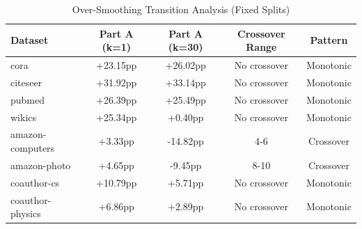 \begin{table}[t]
\centering
\caption{Over-Smoothing Transition Analysis (Fixed Splits)}
\label{tab:crossover_analysis_fixed}
\begin{tabular}{lcccc}
\toprule
\textbf{Dataset} & \textbf{Part A (k=1)} & \textbf{Part A (k=30)} & \textbf{Crossover Range} & \textbf{Pattern} \\
\midrule
cora                 &  +23.15pp &  +26.02pp & No crossover    & Monotonic \\
citeseer             &  +31.92pp &  +33.14pp & No crossover    & Monotonic \\
pubmed               &  +26.39pp &  +25.49pp & No crossover    & Monotonic \\
wikics               &  +25.34pp &   +0.40pp & No crossover    & Monotonic \\
amazon-computers     &   +3.33pp &  -14.82pp & 4-6             & Crossover \\
amazon-photo         &   +4.65pp &   -9.45pp & 8-10            & Crossover \\
coauthor-cs          &  +10.79pp &   +5.71pp & No crossover    & Monotonic \\
coauthor-physics     &   +6.86pp &   +2.89pp & No crossover    & Monotonic \\
\bottomrule
\end{tabular}
\end{table}

